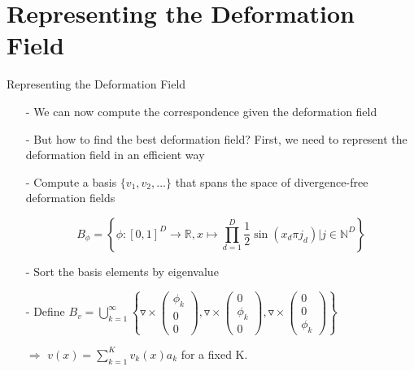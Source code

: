 \documentclass[xcolor=dvipsnames]{beamer}
\begin{document}
\section{Representing the Deformation Field}
\begin{frame}{Representing the Deformation Field}
\begin{enumerate}
\item[-] We can now compute the correspondence given the deformation field
\item[-]But how to find the best deformation field? First, we need to represent the deformation field in an efficient way
\item[-] Compute a basis $\{v_1,v_2,...\}$ that spans the space of divergence-free deformation fields
\pause
\item[] \begin{equation*}
B_\phi = \left\{\phi: [0,1]^D \rightarrow\mathbb{R}, x \mapsto\prod_{d=1}^D \frac{1}{2}\sin(x_d\pi j_d) \big\vert j \in \mathbb{N}^D\right\}
\end{equation*}
\item[-] Sort the basis elements by eigenvalue
\pause
\item[-] Define $B_v = \bigcup_{k=1}^\infty\left\{\triangledown\times\begin{pmatrix}\phi_k\\0\\0\end{pmatrix}, \triangledown\times\begin{pmatrix}0\\\phi_k\\0\end{pmatrix}, \triangledown\times\begin{pmatrix}0\\0\\\phi_k\end{pmatrix}\right\}$
\item[$\Rightarrow$] $v(x) = \sum_{k=1}^K v_k(x)a_k$ for a fixed K.
\end{enumerate}
\end{frame}
\end{document}
